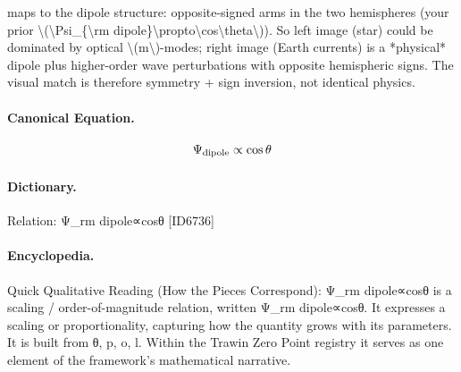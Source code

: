 maps to the dipole structure: opposite-signed arms in the two hemispheres (your prior \textbackslash{}(\textbackslash{}Psi\_\{\textbackslash{}rm dipole\}\textbackslash{}propto\textbackslash{}cos\textbackslash{}theta\textbackslash{})). So left image (star) could be dominated by optical \textbackslash{}(m\textbackslash{})-modes; right image (Earth currents) is a *physical* dipole plus higher-order wave perturbations with opposite hemispheric signs. The visual match is therefore symmetry + sign inversion, not identical physics.

\paragraph{Canonical Equation.}
\[
\Psi_{\rm dipole}\propto\cos\theta
\]

\paragraph{Dictionary.}
Relation: Ψ\_rm dipole∝cosθ [ID6736]

\paragraph{Encyclopedia.}
Quick Qualitative Reading (How the Pieces Correspond): Ψ\_rm dipole∝cosθ is a scaling / order-of-magnitude relation, written Ψ\_rm dipole∝cosθ. It expresses a scaling or proportionality, capturing how the quantity grows with its parameters. It is built from θ, p, o, l. Within the Trawin Zero Point registry it serves as one element of the framework's mathematical narrative.
